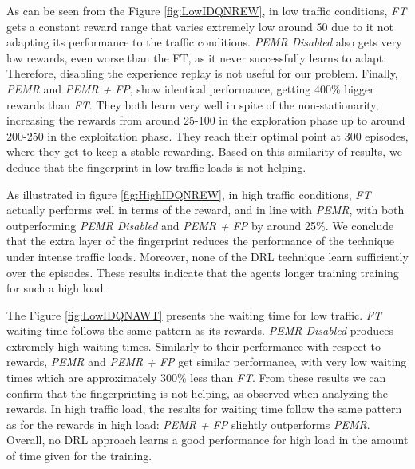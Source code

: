 \documentclass{llncs}
\begin{document}
As can be seen from the Figure \ref{fig:LowIDQNREW}, in low traffic conditions, \textit{FT} gets a constant reward range that varies extremely low around 50 due to it not adapting its performance to the traffic conditions. \textit{PEMR Disabled} also gets very low rewards, even worse than the FT, as it never successfully learns to adapt. Therefore, disabling the experience replay is not useful for our problem. Finally, \textit{PEMR} and \textit{PEMR + FP}, show identical performance, getting 400$\%$ bigger rewards than \textit{FT}. They both learn very well in spite of the non-stationarity, increasing the rewards from around 25-100 in the exploration phase up to around 200-250 in the exploitation phase. They reach their optimal point at 300 episodes, where they get to keep a stable rewarding. Based on this similarity of results, we deduce that the fingerprint in low traffic loads is not helping.

As illustrated in figure \ref{fig:HighIDQNREW}, in high traffic conditions, \textit{FT} actually performs well in terms of the reward, and in line with \textit{PEMR}, with both outperforming \textit{PEMR Disabled} and \textit{PEMR + FP} by around 25$\%$. We conclude that the extra layer of the fingerprint reduces the performance of the technique under intense traffic loads. Moreover, none of the DRL technique learn sufficiently over the episodes. These results indicate that the agents longer training training for such a high load. 

The Figure \ref{fig:LowIDQNAWT} presents the waiting time for low traffic. \textit{FT} waiting time follows the same pattern as its rewards. \textit{PEMR Disabled} produces extremely high waiting times. Similarly to their performance with respect to rewards, \textit{PEMR} and \textit{PEMR + FP} get similar performance, with very low waiting times which are approximately 300$\%$ less than \textit{FT}. From these results we can confirm that the fingerprinting is not helping, as observed when analyzing the rewards. In high traffic load, the results for waiting time follow the same pattern as for the rewards in high load: \textit{PEMR + FP} slightly outperforms \textit{PEMR}. Overall, no DRL approach learns a good performance for high load in the amount of time given for the training.
\end{document}
